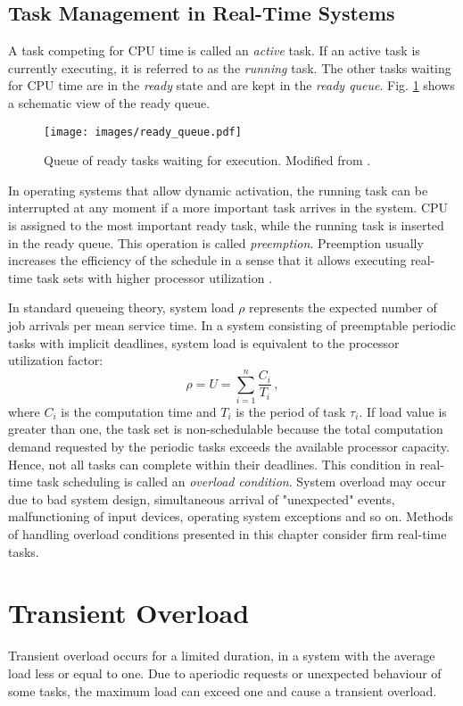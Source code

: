 \subsection{Task Management in Real-Time Systems}
A task competing for CPU time is called an \textit{active} task.
If an active task is currently executing, it is referred to as the \textit{running} task.
The other tasks waiting for CPU time are in the \textit{ready} state and are kept in the \textit{ready queue}.
Fig. \ref{ready_queue} shows a schematic view of the ready queue.
\begin{figure}[ht]
    \centering
    \texttt{[image: images/ready\_queue.pdf]}
    \caption{Queue of ready tasks waiting for execution. Modified from \cite{buttazzo2011hard}.}
    \label{ready_queue}
\end{figure}
In operating systems that allow dynamic activation, the running task can be interrupted at any moment if a more important task arrives in the system.
CPU is assigned to the most important ready task, while the running task is inserted in the ready queue.
This operation is called \textit{preemption}.
Preemption usually increases the efficiency of the schedule in a sense that it allows executing real-time task sets with higher processor utilization \cite{buttazzo2011hard}.

In standard queueing theory, system load $\rho$ represents the expected number of job arrivals per mean service time. 
In a system consisting of preemptable periodic tasks with implicit deadlines, system load is equivalent to the processor utilization factor:
\begin{equation*}
\rho = U = \sum_{i=1}^{n}\frac{C_i}{T_i} \, ,
\end{equation*}
where $C_i$ is the computation time and $T_i$ is the period of task $\tau_i$.
If load value is greater than one, the task set is non-schedulable because the total computation demand requested by the periodic tasks exceeds the available processor capacity.
Hence, not all tasks can complete within their deadlines.
This condition in real-time task scheduling is called an \textit{overload condition}.
System overload may occur due to bad system design, simultaneous arrival of "unexpected" events, malfunctioning of input devices, operating system exceptions and so on.
Methods of handling overload conditions presented in this chapter consider firm real-time tasks.

\section{Transient Overload}
Transient overload occurs for a limited duration, in a system with the average load less or equal to one.
Due to aperiodic requests or unexpected behaviour of some tasks, the maximum load can exceed one and cause a transient overload.

